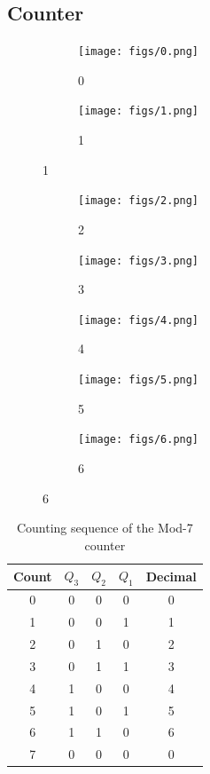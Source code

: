 \documentclass{article}
\begin{document}
\subsection{Counter}
\begin{figure}[h!]
	\begin{subfigure}[b]{100pt}
		\caption{0}
		\texttt{[image: figs/0.png]}
	\end{subfigure}
	\hspace{110pt}
	\begin{subfigure}[b]{100pt}
		\caption{1}
		\texttt{[image: figs/1.png]}
	\end{subfigure}
\end{figure}
\pagebreak
\begin{figure}[h!]
    \begin{subfigure}[b]{100pt}
		\caption{2}
		\texttt{[image: figs/2.png]}
	\end{subfigure}
	\hspace{110pt}
	\begin{subfigure}[b]{100pt}
		\caption{3}
		\texttt{[image: figs/3.png]}
	\end{subfigure}
    \begin{subfigure}[b]{100pt}
		\caption{4}
		\texttt{[image: figs/4.png]}
	\end{subfigure}
	\hspace{110pt}
	\begin{subfigure}[b]{100pt}
		\caption{5}
		\texttt{[image: figs/5.png]}
	\end{subfigure}
    \begin{subfigure}[b]{100pt}
    \centering
		\caption{6}
		\texttt{[image: figs/6.png]}
	\end{subfigure}
	\hspace{110pt}
\end{figure}
\pagebreak
\begin{table}[h!]
\centering
\begin{tabular}{ccccc}
\toprule
Count & $Q_3$ & $Q_2$ & $Q_1$ & Decimal \\
\midrule
0 & 0 & 0 & 0 & 0 \\
1 & 0 & 0 & 1 & 1 \\
2 & 0 & 1 & 0 & 2 \\
3 & 0 & 1 & 1 & 3 \\
4 & 1 & 0 & 0 & 4 \\
5 & 1 & 0 & 1 & 5 \\
6 & 1 & 1 & 0 & 6 \\
7 & 0 & 0 & 0 & 0 \\
\bottomrule
\end{tabular}
\caption{Counting sequence of the Mod-7 counter}
\label{tab:counting_sequence}
\end{table}
\end{document}
